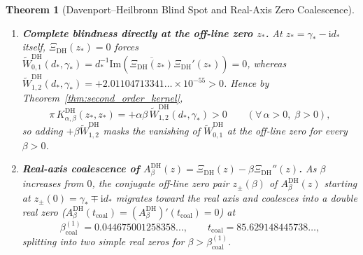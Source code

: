 \documentclass[11pt,reqno]{amsart}
\newtheorem{theorem}{Theorem}[section]
\theoremstyle{definition}
\theoremstyle{remark}
\numberwithin{equation}{section}
\newcommand{\ii}{\mathrm{i}}
\newcommand{\Ima}{\mathrm{Im}}
\begin{document}
\begin{theorem}[Davenport--Heilbronn Blind Spot and Real-Axis Zero Coalescence]
\begin{enumerate}[label=\textup{(\roman*)},leftmargin=2.2em]
\item \textbf{Complete blindness directly at the off-line zero $z_*$.} At $z_* = \gamma_* - \ii d_*$ itself, $\Xi_{\mathrm{DH}}(z_*) = 0$ forces $\widetilde{W}_{0,1}^{\mathrm{DH}}(d_*, \gamma_*) = d_*^{-1}\Ima(\overline{\Xi_{\mathrm{DH}}(z_*)}\Xi_{\mathrm{DH}}'(z_*)) = 0$, whereas $\widetilde{W}_{1,2}^{\mathrm{DH}}(d_*, \gamma_*) = +2.01104713341\ldots \times 10^{-55} > 0$. Hence by Theorem~\ref{thm:second_order_kernel},
\begin{equation}\label{eq:blind_at_zstar}
\pi\,K_{\alpha,\beta}^{\mathrm{DH}}(z_*, z_*) = +\alpha\beta\,\widetilde{W}_{1,2}^{\mathrm{DH}}(d_*, \gamma_*) > 0 \qquad (\forall\, \alpha > 0,\; \beta > 0),
\end{equation}
so adding $+\beta\widetilde{W}_{1,2}^{\mathrm{DH}}$ masks the vanishing of $\widetilde{W}_{0,1}^{\mathrm{DH}}$ at the off-line zero for every $\beta > 0$.
\item \textbf{Real-axis coalescence of $A_\beta^{\mathrm{DH}}(z) = \Xi_{\mathrm{DH}}(z) - \beta\Xi_{\mathrm{DH}}''(z)$.} As $\beta$ increases from $0$, the conjugate off-line zero pair $z_\pm(\beta)$ of $A_\beta^{\mathrm{DH}}(z)$ starting at $z_\pm(0) = \gamma_* \mp \ii d_*$ migrates toward the real axis and coalesces into a double real zero ($A_\beta^{\mathrm{DH}}(t_{\mathrm{coal}}) = (A_\beta^{\mathrm{DH}})'(t_{\mathrm{coal}}) = 0$) at
\begin{equation}\label{eq:beta_coal_dh}
\beta_{\mathrm{coal}}^{(1)} = 0.044675001258358\ldots, \qquad t_{\mathrm{coal}} = 85.629148445738\ldots,
\end{equation}
splitting into two simple real zeros for $\beta > \beta_{\mathrm{coal}}^{(1)}$.
\end{enumerate}
\end{theorem}
\end{document}
